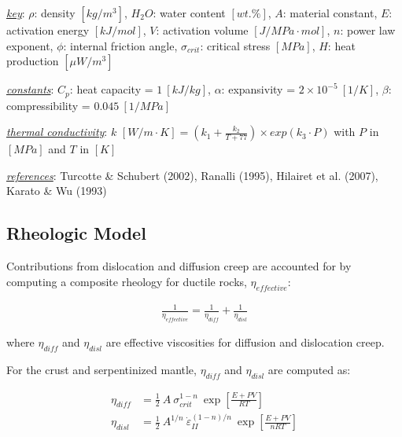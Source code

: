 \begin{table}
{\begin{threeparttable}
\begin{tabular}[t]{lrrlrrrrrrrrlr}
\bottomrule
\end{tabular}
\begin{tablenotes}
\item \uline{\textit{key}}: $\rho$: density $[kg/m^3]$, $H_2O$: water content $[wt.\%]$, $A$: material constant, $E$: activation energy $[kJ/mol]$, $V$: activation volume $[J/MPa\cdot mol]$, $n$: power law exponent, $\phi$: internal friction angle, $\sigma_{crit}$: critical stress $[MPa]$, $H$: heat production $[\mu W/m^3]$
\item \uline{\textit{constants}}: $C_p$: heat capacity = $1~[kJ/kg]$, $\alpha$: expansivity = $2\times 10^{-5}~[1/K]$, $\beta$: compressibility = $0.045~[1/MPa]$
\item \uline{\textit{thermal conductivity}}: $k$ $[W/m \cdot K]=(k_1+\frac{k_2}{T+77})\times exp(k_3 \cdot P)$ with $P$ in $[MPa]$ and $T$ in $[K]$
\item \uline{\textit{references}}: Turcotte \& Schubert (2002), Ranalli (1995), Hilairet et al. (2007), Karato \& Wu (1993)
\end{tablenotes}
\end{threeparttable}}
\end{table}

\hypertarget{rheologicModel}{%
\subsection{Rheologic Model}\label{rheologicModel}}

Contributions from dislocation and diffusion creep are accounted for by computing a composite rheology for ductile rocks, \(\eta_{effective}\):

\begin{equation}
  \begin{aligned}
    \frac{1}{\eta_{effective}} = \frac{1}{\eta_{diff}} + \frac{1}{\eta_{disl}}
  \end{aligned} 
  \label{eq:ductile}
\end{equation}

where \(\eta_{diff}\) and \(\eta_{disl}\) are effective viscosities for diffusion and dislocation creep.

For the crust and serpentinized mantle, \(\eta_{diff}\) and \(\eta_{disl}\) are computed as:

\begin{equation}
  \begin{aligned}
    \eta_{diff} &= \frac{1}{2} \ A \ \sigma_{crit}^{1-n} \ \exp\left[\frac{E+PV}{RT}\right] \\
    \eta_{disl} &= \frac{1}{2} \ A^{1/n} \ \dot{\varepsilon}_{II}^{(1-n)/n} \ \exp\left[\frac{E+PV}{nRT}\right]
  \label{eq:crust}
  \end{aligned}
\end{equation}

